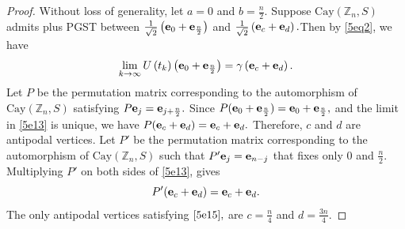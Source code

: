 \documentclass[10pt,a4paper]{amsart}
\def \e {{\bf e}}
\newcommand{\ob}[1]{\left(#1\right)}
\begin{document}
\begin{proof}
    Without loss of generality, let $a=0$ and $b=\frac{n}{2}.$ Suppose $\text{Cay}(\mathbb{Z}_n, S)$ admits plus PGST between $\frac{1}{\sqrt{2}}\ob{\e_0+\e_{\frac{n}{2}}}$ and $\frac{1}{\sqrt{2}}\ob{\e_c+\e_d}.$Then by \eqref{5eq2}, we have 
\begin{equation}\label{5e13}
       \lim_{k \to \infty}U\ob{t_k}\ob{\e_0+\e_{\frac{n}{2}}}=\gamma\ob{\e_c+\e_d}.
   \end{equation}
    Let $P$ be the permutation matrix corresponding to the automorphism of $\text{Cay}(\mathbb{Z}_n, S)$ satisfying $P\e_j=\e_{j+\frac{n}{2}}.$ Since $P(\e_0+\e_{\frac{n}{2}})=\e_0+\e_{\frac{n}{2}},$ and the limit in \eqref{5e13} is unique, we have
$P(\e_c+\e_d)=\e_c+\e_d.$
Therefore, $c$ and $d$ are antipodal vertices. Let $P'$ be the permutation matrix corresponding to the automorphism of $\text{Cay}(\mathbb{Z}_n, S)$ such that $P'\e_j=\e_{n-j} $ that fixes only $0$ and $\frac{n}{2}.$ Multiplying $P'$ on both sides of \eqref{5e13}, gives 
\begin{equation}\label{5e15}
P'(\e_c+\e_d)=\e_c+\e_d.
\end{equation}
The only antipodal vertices satisfying $\eqref{5e15},$ are $c=\frac{n}{4}$ and $d=\frac{3n}{4}.$ 
\end{proof}
\end{document}

